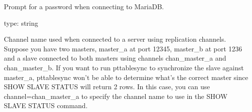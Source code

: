 \documentclass[letterpaper,10pt,english]{sphinxmanual}
\begin{document}
\begin{fulllineitems}
\label{\detokenize{mariadb-schema-change:cmdoption-mariadb-schema-change-ask-pass}}
Prompt for a password when connecting to MariaDB.

\end{fulllineitems}


\begin{fulllineitems}
\label{\detokenize{mariadb-schema-change:cmdoption-mariadb-schema-change-channel}}
type: string

Channel name used when connected to a server using replication channels.
Suppose you have two masters, master\_a at port 12345, master\_b at port 1236 and
a slave connected to both masters using channels chan\_master\_a and chan\_master\_b.
If you want to run pt\sphinxhyphen{}table\sphinxhyphen{}sync to synchronize the slave against master\_a, pt\sphinxhyphen{}table\sphinxhyphen{}sync
won’t be able to determine what’s the correct master since SHOW SLAVE STATUS
will return 2 rows. In this case, you can use \textendash{}channel=chan\_master\_a to specify
the channel name to use in the SHOW SLAVE STATUS command.

\end{fulllineitems}

\end{document}
